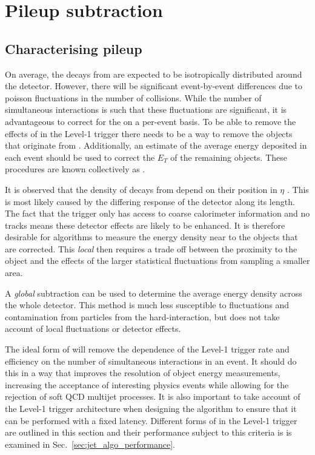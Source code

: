 \section{Pileup subtraction}
\label{sec:pus}

\subsection{Characterising pileup}

On average, the decays from \PU are expected to be isotropically
distributed around the detector. However, there will be significant
event-by-event differences due to poisson fluctuations in the number
of \PU collisions. While the number of simultaneous interactions is
such that these fluctuations are significant, it is advantageous to
correct for the \PU on a per-event basis. To be able to remove the
effects of \PU in the Level-1 trigger there needs to be a way to remove
the objects that originate from \PU. Additionally, an
estimate of the average energy deposited in each event should be used
to correct the $E_T$ of the remaining objects. These procedures are
known collectively as \emph{\PUS}.

It is observed that the density of decays from \PU 
depend on their position in $\eta$ \cite{Cacciari2011}. This is
most likely caused by the differing response of the detector along its
length. The fact that the trigger only has access to
coarse calorimeter information and no tracks means these detector
effects are likely to be enhanced. It is therefore desirable for \PUS
algorithms to measure the \PU energy density near to the objects that
are corrected. This \emph{local} \PUS then requires a trade off
between the proximity to the object and the effects of the
larger statistical fluctuations from sampling a smaller area. 

A \emph{global} subtraction can be used to determine the average
energy density across the whole detector. This method is much less
susceptible to fluctuations and contamination from particles from the
hard-interaction, but does not take account of local fluctuations or
detector effects.

The ideal form of \PUS will remove the dependence of the Level-1
trigger rate and efficiency on the number of simultaneous interactions
in an event. It should do this in a way that improves the resolution
of object energy measurements, increasing the acceptance
of interesting physics events while allowing for the rejection of soft
QCD multijet processes. It is also important to take account of the
Level-1 trigger architecture when designing the algorithm to ensure
that it can be performed with a fixed latency. Different forms of \PUS
in the Level-1 trigger are outlined in this section and their
performance subject to this criteria is is examined in
Sec.~\ref{sec:jet_algo_performance}. 

